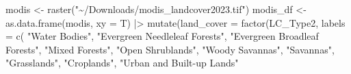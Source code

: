 \documentclass[
  12pt,
  letterpaper,
  DIV=11,
  numbers=noendperiod]{scrartcl}
\newenvironment{Shaded}{\begin{snugshade}}{\end{snugshade}}
\newcommand{\AttributeTok}[1]{\textcolor[rgb]{0.40,0.45,0.13}{#1}}
\newcommand{\FunctionTok}[1]{\textcolor[rgb]{0.28,0.35,0.67}{#1}}
\newcommand{\NormalTok}[1]{\textcolor[rgb]{0.00,0.23,0.31}{#1}}
\newcommand{\OtherTok}[1]{\textcolor[rgb]{0.00,0.23,0.31}{#1}}
\newcommand{\SpecialCharTok}[1]{\textcolor[rgb]{0.37,0.37,0.37}{#1}}
\newcommand{\StringTok}[1]{\textcolor[rgb]{0.13,0.47,0.30}{#1}}
\begin{document}
\begin{Shaded}
\begin{Highlighting}[]
\NormalTok{modis }\OtherTok{\textless{}{-}} \FunctionTok{raster}\NormalTok{(}\StringTok{"\textasciitilde{}/Downloads/modis\_landcover2023.tif"}\NormalTok{)}
\NormalTok{modis\_df }\OtherTok{\textless{}{-}} \FunctionTok{as.data.frame}\NormalTok{(modis, }\AttributeTok{xy =}\NormalTok{ T) }\SpecialCharTok{|\textgreater{}} 
  \FunctionTok{mutate}\NormalTok{(}\AttributeTok{land\_cover =} \FunctionTok{factor}\NormalTok{(LC\_Type2, }\AttributeTok{labels =} \FunctionTok{c}\NormalTok{(}
    \StringTok{"Water Bodies"}\NormalTok{, }\StringTok{"Evergreen Needleleaf Forests"}\NormalTok{, }\StringTok{"Evergreen Broadleaf Forests"}\NormalTok{,}
    \StringTok{"Mixed Forests"}\NormalTok{, }\StringTok{"Open Shrublands"}\NormalTok{, }\StringTok{"Woody Savannas"}\NormalTok{, }\StringTok{"Savannas"}\NormalTok{, }\StringTok{"Grasslands"}\NormalTok{,}
    \StringTok{"Croplands"}\NormalTok{, }\StringTok{"Urban and Built{-}up Lands"}


\end{Highlighting}
\end{Shaded}
\end{document}
